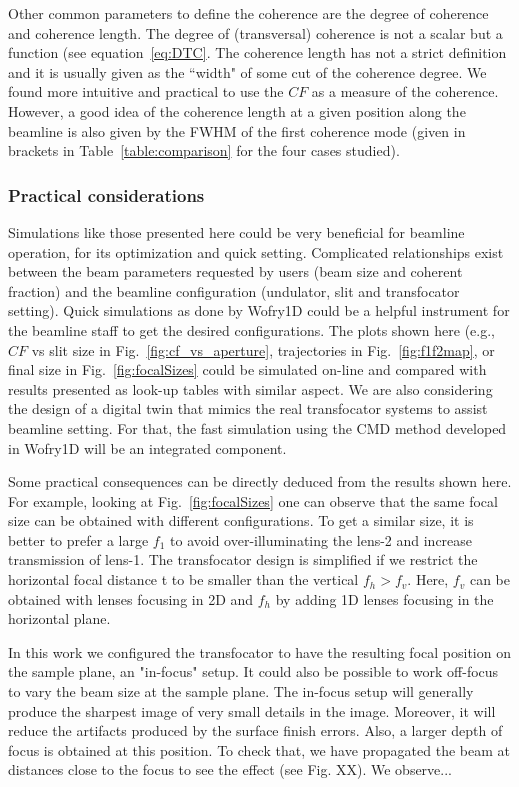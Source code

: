 \documentclass{iucr}              %
\begin{document}
Other common parameters to define the coherence are the degree of coherence and coherence length. The degree of (transversal) coherence is not a scalar but a function (see equation~\ref{eq:DTC}. The coherence length has not a strict definition and it is usually given as the ``width" of some cut of the coherence degree. We found more intuitive and practical to use the $CF$ as a measure of the coherence. However, a good idea of the coherence length at a given position along the beamline is also given by the FWHM of the first coherence mode (given in brackets in Table~\ref{table:comparison} for the four cases studied).    


\subsubsection{Practical considerations} Simulations like those presented here could be very beneficial for beamline operation, for its optimization and quick setting.  Complicated  relationships exist between the beam parameters requested by users (beam size and coherent fraction) and the beamline configuration (undulator, slit and transfocator setting). Quick simulations as done by Wofry1D could be a helpful instrument for the beamline staff to get the desired configurations. The plots shown here (e.g., $CF$ vs slit size in Fig.~\ref{fig:cf_vs_aperture}, trajectories in Fig.~\ref{fig:f1f2map}, or final size in Fig.~\ref{fig:focalSizes} could be simulated on-line and compared with results presented as look-up tables with similar aspect. We are also considering the design of a digital twin that mimics the real transfocator systems to assist beamline setting. For that, the fast simulation using the CMD method developed in Wofry1D will be an integrated component.  

Some practical consequences can be directly deduced from the results shown here. For example, looking at Fig.~\ref{fig:focalSizes} one can observe that the same focal size can be obtained with different configurations. To get a similar size, it is better to prefer a large $f_1$ to avoid over-illuminating the lens-2 and increase transmission of lens-1. The transfocator design is simplified if we restrict the horizontal focal distance t to be smaller than the vertical $f_h>f_v$. Here, $f_v$ can be obtained with lenses focusing in 2D and $f_h$ by adding 1D lenses focusing in the horizontal plane. 

In this work we configured the transfocator to have the resulting focal position on the sample plane, an "in-focus" setup. It could also be possible to work off-focus to vary the beam size at the sample plane. The in-focus setup will generally produce the sharpest image of very small details in the image. Moreover, it will reduce the artifacts produced by the surface finish errors. Also, a larger depth of focus is obtained at this position. To check that, we have propagated the beam at distances close to the focus to see the effect (see Fig. XX). We observe...
\end{document}
